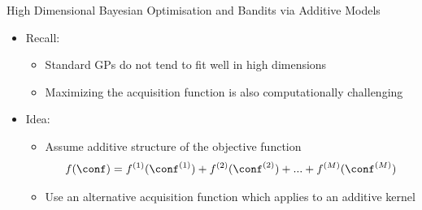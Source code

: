 \begin{frame}{High Dimensional Bayesian Optimisation and Bandits via Additive Models}
\vspace{2em}
\begin{itemize}
    \item Recall:

    \begin{itemize}
        \item Standard GPs do not tend to fit well in high dimensions
        \item Maximizing the acquisition function is also computationally challenging
        \pause
    \end{itemize}
\medskip
    \item Idea:
    \begin{itemize}
        \item Assume additive structure of the objective function
        \begin{equation*}
            f(\conf)=f^{(1)}(\conf^{(1)})+f^{(2)}(\conf^{(2)})+...+f^{(M)}(\conf^{(M)})
        \end{equation*}
        \item Use an alternative acquisition function which applies to an additive kernel
    \end{itemize}
\end{itemize}

\end{frame}

